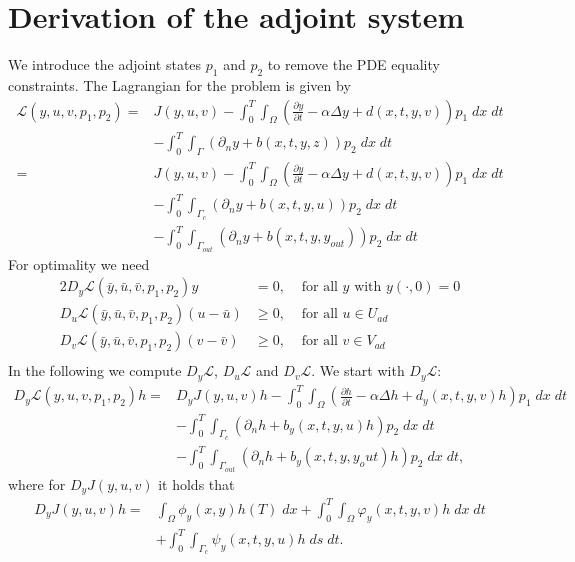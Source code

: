 \documentclass[
12pt, %
a4paper, %
onecolumn, %
portrait %
]{article}
\begin{document}
\section{Derivation of the adjoint system}
We introduce the adjoint states $p_1$ and $p_2$ to remove the PDE equality constraints. The Lagrangian for the problem is given by
\begin{align*}
\mathcal{L}(y,u,v,p_1, p_2) = & J(y,u,v) - \int_{0}^{T} \int_{\Omega} (\frac{\partial y}{\partial t} - \alpha \Delta y + d(x,t,y,v)) p_1 \; dx \; dt \\ & - \int_{0}^{T} \int_{\Gamma} (\partial_n y + b(x,t,y,z)) p_2 \; dx \; dt \\
= & J(y,u,v) - \int_{0}^{T} \int_{\Omega} (\frac{\partial y}{\partial t} - \alpha \Delta y + d(x,t,y,v)) p_1 \; dx \; dt \\ & - \int_{0}^{T} \int_{\Gamma_c} (\partial_n y + b(x,t,y,u)) p_2 \; dx \; dt \\
& - \int_{0}^{T} \int_{\Gamma_{out}} (\partial_n y + b(x,t,y,y_{out})) p_2 \; dx \; dt
\end{align*}
For optimality we need
\begin{alignat*}{2}
D_y \mathcal{L}(\bar{y},\bar{u},\bar{v},p_1, p_2) y & = 0, &\text{ for all } y \text{ with } y(\cdot, 0) = 0 \\
D_u \mathcal{L}(\bar{y},\bar{u},\bar{v},p_1, p_2) (u - \bar{u}) & \geq 0, &\text{ for all } u \in U_{ad} \\
D_v \mathcal{L}(\bar{y},\bar{u},\bar{v},p_1, p_2) (v - \bar{v}) & \geq 0, &\text{ for all } v \in V_{ad} \\
\end{alignat*}
In the following we compute $D_y \mathcal{L}$, $D_u \mathcal{L}$ and $D_v \mathcal{L}$. We start with $D_y \mathcal{L}$:
\begin{align*}
 D_y \mathcal{L}(y, u,v, p_1, p_2) h = & D_y J(y,u,v) h - \int_{0}^{T} \int_{\Omega} (\frac{\partial h}{\partial t} - \alpha \Delta h + d_y(x,t,y,v) h) p_1 \; dx \; dt \\ 
& - \int_{0}^{T} \int_{\Gamma_c} (\partial_n h + b_y(x,t,y,u) h) p_2 \; dx \; dt \\ 
& - \int_{0}^{T} \int_{\Gamma_{out}} (\partial_n h + b_y(x,t,y,y_out) h) p_2 \; dx \; dt,
\end{align*}
where for $D_y J(y,u,v)$ it holds that
\begin{align*}
D_y J(y,u,v) h = & \int_{\Omega} \phi_y(x,y) h(T) \; dx + \int_{0}^{T} \int_{\Omega} \varphi_y(x,t,y, v) h \; dx \; dt  \\
& + \int_{0}^{T} \int_{\Gamma_c} \psi_y(x,t,y, u) h \; ds \; dt.
\end{align*}
\end{document}
